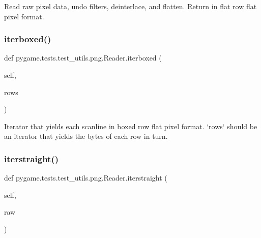 \begin{DoxyVerb}Read raw pixel data, undo filters, deinterlace, and flatten.
Return in flat row flat pixel format.
\end{DoxyVerb}
 \mbox{\label{classpygame_1_1tests_1_1test__utils_1_1png_1_1_reader_a848bf0db133eac64b60d8b23f8f9fced}} 
\subsubsection{\texorpdfstring{iterboxed()}{iterboxed()}}
{\footnotesize\ttfamily def pygame.\+tests.\+test\+\_\+utils.\+png.\+Reader.\+iterboxed (\begin{DoxyParamCaption}\item[{}]{self,  }\item[{}]{rows }\end{DoxyParamCaption})}

\begin{DoxyVerb}Iterator that yields each scanline in boxed row flat pixel
format.  `rows` should be an iterator that yields the bytes of
each row in turn.
\end{DoxyVerb}
 \mbox{\label{classpygame_1_1tests_1_1test__utils_1_1png_1_1_reader_a9753fc5d779635c9180fac77b4b1c578}} 
\subsubsection{\texorpdfstring{iterstraight()}{iterstraight()}}
{\footnotesize\ttfamily def pygame.\+tests.\+test\+\_\+utils.\+png.\+Reader.\+iterstraight (\begin{DoxyParamCaption}\item[{}]{self,  }\item[{}]{raw }\end{DoxyParamCaption})}

